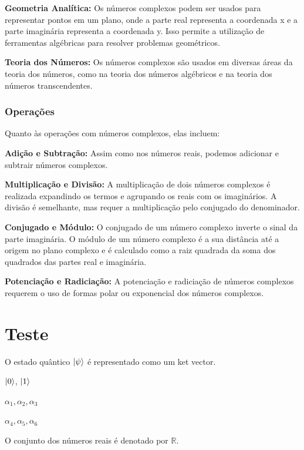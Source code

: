 \documentclass[12pt]{article}
\begin{document}
\textbf{Geometria Analítica:} Os números complexos podem ser usados para representar pontos em um plano, onde a parte real representa a coordenada x e a parte imaginária representa a coordenada y. Isso permite a utilização de ferramentas algébricas para resolver problemas geométricos.

\textbf{Teoria dos Números:} Os números complexos são usados em diversas áreas da teoria dos números, como na teoria dos números algébricos e na teoria dos números transcendentes.

\subsubsection{Operações}

Quanto às operações com números complexos, elas incluem:

\textbf{Adição e Subtração:} Assim como nos números reais, podemos adicionar e subtrair números complexos.

\textbf{Multiplicação e Divisão:} A multiplicação de dois números complexos é realizada expandindo os termos e agrupando os reais com os imaginários. A divisão é semelhante, mas requer a multiplicação pelo conjugado do denominador.

\textbf{Conjugado e Módulo:} O conjugado de um número complexo inverte o sinal da parte imaginária. O módulo de um número complexo é a sua distância até a origem no plano complexo e é calculado como a raiz quadrada da soma dos quadrados das partes real e imaginária.

\textbf{Potenciação e Radiciação:} A potenciação e radiciação de números complexos requerem o uso de formas polar ou exponencial dos números complexos.

\section{Teste}

O estado quântico $\ket{\psi}$ é representado como um ket vector.

$\ket{0}$, $\ket{1}$

$\alpha_{1}, \alpha_{2}, \alpha_{3}$

\(\alpha_{4}, \alpha_{5}, \alpha_{6} \)

O conjunto dos números reais é denotado por $\mathbb{R}$.



\newpage

	
\end{document}
